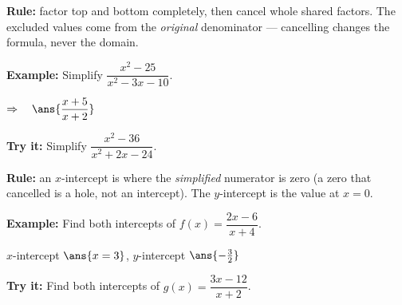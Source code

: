 \documentclass[12pt]{article}
\begin{document}


\begin{formulabox}
\textbf{Rule:} factor top and bottom completely, then cancel whole shared
factors. The excluded values come from the \emph{original} denominator ---
cancelling changes the formula, never the domain.
\end{formulabox}

\begin{examplebox}
\textbf{Example:} \quad Simplify $\dfrac{x^2-25}{x^2-3x-10}$.

$\Rightarrow\quad \ans{\dfrac{x+5}{x+2}}$
\end{examplebox}

\begin{tryitbox}
\textbf{Try it:} \quad Simplify $\dfrac{x^2-36}{x^2+2x-24}$.\\[2pt]
\end{tryitbox}


\begin{formulabox}
\textbf{Rule:} an $x$-intercept is where the \emph{simplified} numerator is zero
(a zero that cancelled is a hole, not an intercept). The $y$-intercept is the
value at $x = 0$.
\end{formulabox}

\begin{examplebox}
\textbf{Example:} \quad Find both intercepts of $f(x) = \dfrac{2x-6}{x+4}$.

$x$-intercept $\ans{x = 3}$, \quad $y$-intercept $\ans{-\tfrac{3}{2}}$
\end{examplebox}

\begin{tryitbox}
\textbf{Try it:} \quad Find both intercepts of $g(x) = \dfrac{3x-12}{x+2}$.\\[2pt]
\end{tryitbox}
\end{document}
